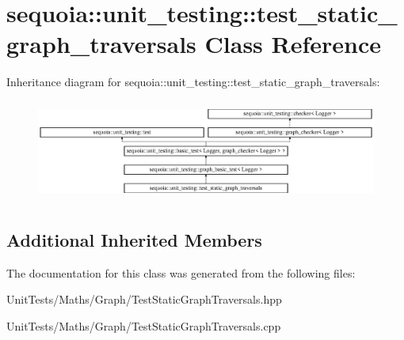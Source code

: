\hypertarget{classsequoia_1_1unit__testing_1_1test__static__graph__traversals}{}\section{sequoia\+::unit\+\_\+testing\+::test\+\_\+static\+\_\+graph\+\_\+traversals Class Reference}
\label{classsequoia_1_1unit__testing_1_1test__static__graph__traversals}
Inheritance diagram for sequoia\+::unit\+\_\+testing\+::test\+\_\+static\+\_\+graph\+\_\+traversals\+:\begin{figure}[H]
\begin{center}
\leavevmode
\includegraphics[height=3.357314cm]{classsequoia_1_1unit__testing_1_1test__static__graph__traversals}
\end{center}
\end{figure}
\subsection*{Additional Inherited Members}


The documentation for this class was generated from the following files\+:\begin{DoxyCompactItemize}
\item 
Unit\+Tests/\+Maths/\+Graph/Test\+Static\+Graph\+Traversals.\+hpp\item 
Unit\+Tests/\+Maths/\+Graph/Test\+Static\+Graph\+Traversals.\+cpp\end{DoxyCompactItemize}
